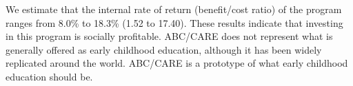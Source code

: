 We estimate that the internal rate of return (benefit/cost ratio) of the program ranges from 8.0\% to 18.3\% (1.52 to 17.40). These results indicate that investing in this program is socially profitable. ABC/CARE does not represent what is generally offered as early childhood education, although it has been widely replicated around the world. ABC/CARE is a prototype of what early childhood education should be.

\singlespace




